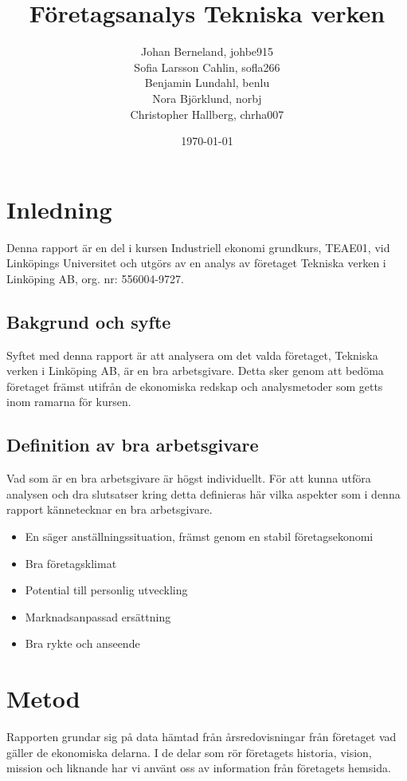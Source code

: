 \documentclass[10pt,a4paper]{article}
\title{Företagsanalys Tekniska verken}
\author{Johan Berneland, johbe915\\Sofia Larsson Cahlin, sofla266\\Benjamin Lundahl, benlu\\
    Nora Björklund, norbj\\Christopher Hallberg, chrha007}
\date{\today}
\begin{document}
\maketitle

\newpage

\tableofcontents

\newpage

\section{Inledning}
Denna rapport är en del i kursen Industriell ekonomi grundkurs, TEAE01, vid Linköpings Universitet och utgörs av en analys av företaget Tekniska verken i Linköping AB, org. nr: 556004-9727.

\subsection{Bakgrund och syfte}
Syftet med denna rapport är att analysera om det valda företaget, Tekniska verken i Linköping AB, är en bra arbetsgivare. Detta sker genom att bedöma företaget främst utifrån de ekonomiska redskap och analysmetoder som getts inom ramarna för kursen. 

\subsection{Definition av bra arbetsgivare}
Vad som är en bra arbetsgivare är högst individuellt. För att kunna utföra analysen och dra slutsatser kring detta definieras här vilka aspekter som i denna rapport kännetecknar en bra arbetsgivare.

\begin{itemize}
 \item En säger anställningssituation, främst genom en stabil företagsekonomi 
 \item Bra företagsklimat
 \item Potential till personlig utveckling
 \item Marknadsanpassad ersättning
 \item Bra rykte och anseende
\end{itemize}

\section{Metod}
Rapporten grundar sig på data hämtad från årsredovisningar från företaget vad
gäller de ekonomiska delarna. I de delar som rör företagets historia, vision,
mission och liknande har vi använt oss av information från företagets hemsida.
\end{document}
